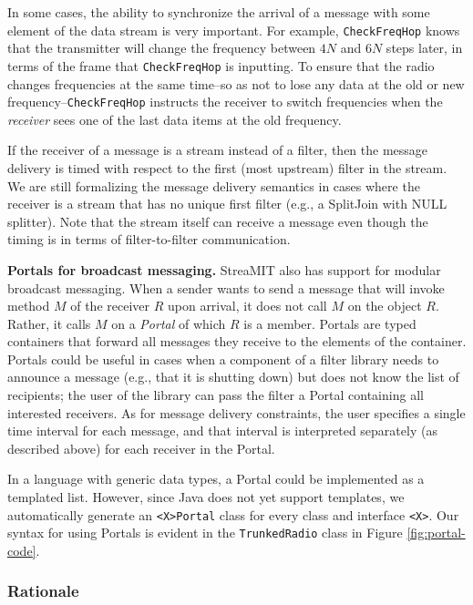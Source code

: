 In some cases, the ability to synchronize the arrival of a message
with some element of the data stream is very important.  For example,
{\tt CheckFreqHop} knows that the transmitter will change the
frequency between $4N$ and $6N$ steps later, in terms of the frame
that {\tt CheckFreqHop} is inputting.  To ensure that the radio
changes frequencies at the same time--so as not to lose any data at
the old or new frequency--{\tt CheckFreqHop} instructs the receiver to
switch frequencies when the {\it receiver} sees one of the last data
items at the old frequency.

If the receiver of a message is a stream instead of a filter, then the
message delivery is timed with respect to the first (most upstream)
filter in the stream.  We are still formalizing the message delivery
semantics in cases where the receiver is a stream that has no unique
first filter (e.g., a SplitJoin with NULL splitter).  Note that the
stream itself can receive a message even though the timing is in terms
of filter-to-filter communication.

{\bf Portals for broadcast messaging.}  StreaMIT also has support for
modular broadcast messaging.  When a sender wants to send a message
that will invoke method $M$ of the receiver $R$ upon arrival, it does
not call $M$ on the object $R$.  Rather, it calls $M$ on a {\it
Portal} of which $R$ is a member.  Portals are typed containers that
forward all messages they receive to the elements of the container.
Portals could be useful in cases when a component of a filter library
needs to announce a message (e.g., that it is shutting down) but does
not know the list of recipients; the user of the library can pass the
filter a Portal containing all interested receivers.  As for message
delivery constraints, the user specifies a single time interval for
each message, and that interval is interpreted separately (as
described above) for each receiver in the Portal.

In a language with generic data types, a Portal could be implemented
as a templated list.  However, since Java does not yet support
templates, we automatically generate an {\tt <X>Portal} class for
every class and interface {\tt <X>}.  Our syntax for using Portals is
evident in the {\tt TrunkedRadio} class in Figure
\ref{fig:portal-code}.

\subsubsection{Rationale}


